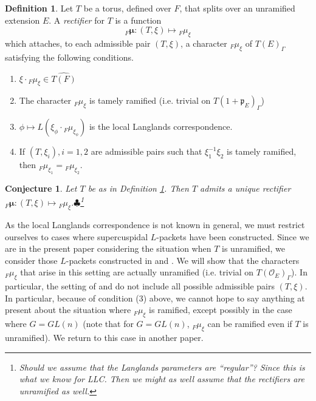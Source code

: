 \documentclass[11pt]{amsart}
\theoremstyle{plain}
\newtheorem{conjecture}[theorem]{Conjecture}
\newcommand{\MAxxx}[1]{$\clubsuit$\footnote{#1}}
\theoremstyle{definition}
\newtheorem{definition}[theorem]{Definition}
\begin{document}
\begin{definition}\label{rectifierdefinition}
  Let $T$ be a torus, defined over $F$, that splits over an unramified
  extension $E$.  A \emph{rectifier} for $T$ is a function $${}_F
  \boldsymbol\mu : (T, \xi) \mapsto {}_F \mu_{\xi}$$ which attaches,
  to each admissible pair $(T, \xi)$, a character ${}_F
  \mu_{\xi}$ of $T(E)_{\Gamma}$ satisfying the following conditions.

\begin{enumerate}
\item $\xi \cdot {}_F \mu_{\xi} \in \widehat{T(F)}$

\item The character ${}_F \mu_{\xi}$ is tamely ramified (i.e. trivial on
  $T(1 + \mathfrak{p}_E)_{\Gamma}$)

\item $\phi \mapsto L(\xi_{\phi} \cdot {}_F \mu_{\xi_{\phi}})$
  is the local Langlands correspondence.

\item If $(T, \xi_i), i = 1,2$ are admissible pairs  such that
$\xi_1^{-1} \xi_2$ is tamely ramified, then
${}_F \mu_{\xi_1} = {}_F \mu_{\xi_2}$.
\end{enumerate}

\end{definition}

\begin{conjecture}
  Let $T$ be as in Definition \ref{rectifierdefinition}.  Then $T$
  admits a unique rectifier ${}_F \boldsymbol\mu : (T, \xi) \mapsto
  {}_F \mu_{\xi}$.\MAxxx{Should we assume that the Langlands parameters
  are ``regular''?  Since this is what we know for LLC.  Then we might
  as well assume that the rectifiers are unramified as well.}
\end{conjecture}

As the local Langlands correspondence is not known in general, we must restrict
ourselves to cases where supercuspidal $L$-packets have been constructed.
Since we are in the present paper considering the situation when $T$ is unramified,
we consider those $L$-packets constructed in \cite{debackerreeder} and \cite{reeder}.
We will show that the characters ${}_F \mu_{\xi}$ that arise in this setting
are actually unramified (i.e. trivial on $T(\mathcal{O}_E)_{\Gamma}$).  In particular, 
the setting
of \cite{debackerreeder} and \cite{reeder} do not include all possible admissible
pairs $(T, \xi)$.  In particular, because of condition (3) above, we cannot hope
to say anything at present about the situation where ${}_F \mu_{\xi}$ is ramified,
except possibly in the case where $G = GL(n)$ (note that for
$G = GL(n)$, ${}_F \mu_{\xi}$ can be ramified even if $T$ is unramified).
We return to this case in another paper.
\end{document}
